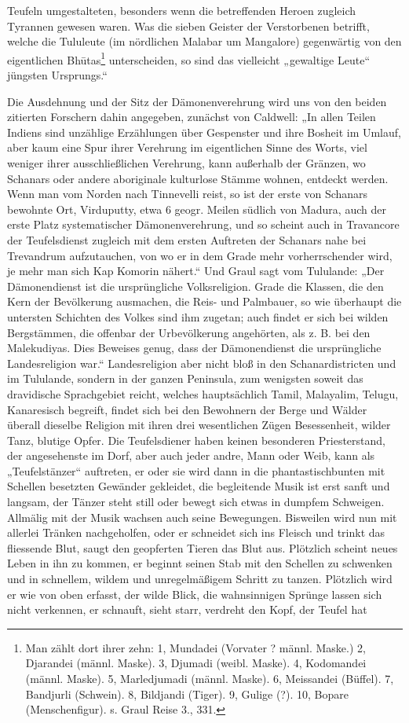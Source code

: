 \documentclass{article}
\begin{document}
Teufeln umgestalteten, besonders wenn die betreffenden Heroen zugleich Tyrannen gewesen waren. Was die sieben Geister der Verstorbenen betrifft, welche die Tululeute (im nördlichen Malabar um Mangalore) gegenwärtig von den eigentlichen Bh\={u}tas\footnote{Man zählt dort ihrer zehn: 1, Mundadei (Vorvater ? männl. Maske.) 2, Djarandei (männl. Maske). 3, Djumadi (weibl. Maske). 4, Kodomandei (männl. Maske). 5, Marledjumadi (männl. Maske). 6, Meissandei (Büffel). 7, Bandjurli (Schwein). 8, Bildjandi (Tiger). 9, Gulige (?). 10, Bopare (Menschenfigur). s. Graul Reise 3., 331.} unterscheiden, so sind das vielleicht „gewaltige Leute“ jüngsten Ursprungs.“

Die Ausdehnung und der Sitz der Dämonenverehrung wird uns von den beiden zitierten Forschern dahin angegeben, zunächst von Caldwell: „In allen Teilen Indiens sind unzählige Erzählungen über Gespenster und ihre Bosheit im Umlauf, aber kaum eine Spur ihrer Verehrung im eigentlichen Sinne des Worts, viel weniger ihrer ausschließlichen Verehrung, kann außerhalb der Gränzen, wo Schanars oder andere aboriginale kulturlose Stämme wohnen, entdeckt werden. Wenn man vom Norden nach Tinnevelli reist, so ist der erste von Schanars bewohnte Ort, Virduputty, etwa 6 geogr. Meilen südlich von Madura, auch der erste Platz systematischer Dämonenverehrung, und so scheint auch in Travancore der Teufelsdienst zugleich mit dem ersten Auftreten der Schanars nahe bei Trevandrum aufzutauchen, von wo er in dem Grade mehr vorherrschender wird, je mehr man sich Kap Komorin nähert.“ Und Graul sagt vom Tululande: „Der Dämonendienst ist die ursprüngliche Volksreligion. Grade die Klassen, die den Kern der Bevölkerung ausmachen, die Reis- und Palmbauer, so wie überhaupt die untersten Schichten des Volkes sind ihm zugetan; auch findet er sich bei wilden Bergstämmen, die offenbar der Urbevölkerung angehörten, als z. B. bei den Malekudiyas. Dies Beweises genug, dass der Dämonendienst die ursprüngliche Landesreligion war.“ Landesreligion aber nicht bloß in den Schanardistricten und im Tululande, sondern in der ganzen Peninsula, zum wenigsten soweit das dravidische Sprachgebiet reicht, welches hauptsächlich Tamil, Malayalim, Telugu, Kanaresisch begreift, findet sich bei den Bewohnern der Berge und Wälder überall dieselbe Religion mit ihren drei wesentlichen Zügen Besessenheit, wilder Tanz, blutige Opfer. Die Teufelsdiener haben keinen besonderen Priesterstand, der angesehenste im Dorf, aber auch jeder andre, Mann oder Weib, kann als „Teufelstänzer“ auftreten, er oder sie wird dann in die phantastischbunten mit Schellen besetzten Gewänder gekleidet, die begleitende Musik ist erst sanft und langsam, der Tänzer steht still oder bewegt sich etwas in dumpfem Schweigen. Allmälig mit der Musik wachsen auch seine Bewegungen. Bisweilen wird nun mit allerlei Tränken nachgeholfen, oder er schneidet sich ins Fleisch und trinkt das fliessende Blut, saugt den geopferten Tieren das Blut aus. Plötzlich scheint neues Leben in ihn zu kommen, er beginnt seinen Stab mit den Schellen zu schwenken und in schnellem, wildem und unregelmäßigem Schritt zu tanzen. Plötzlich wird er wie von oben erfasst, der wilde Blick, die wahnsinnigen Sprünge lassen sich nicht verkennen, er schnauft, sieht starr, verdreht den Kopf, der Teufel hat 
\end{document}
